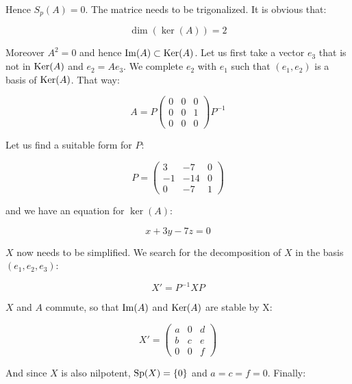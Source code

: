 \documentclass[11pt]{article}
\begin{document}
Hence $S_p(A) = {0}$. The matrice needs to be trigonalized. It is obvious that:

\begin{equation}
    \dim(\ker(A)) = 2
\end{equation}

Moreover $A^2 = 0$ and hence $\mathrm{Im}(A) \subset \mathrm{Ker}(A)$. Let us 
first take a vector $e_3$ that is not in $\mathrm{Ker}(A)$ and 
$e_2 = A e_3$. We complete $e_2$ with $e_1$ such that $(e_1, e_2)$ is a
basis of $\mathrm{Ker}(A)$. That way:

\begin{equation}
    A = P\begin{pmatrix} 0 & 0 & 0 \\ 0 & 0 & 1 \\ 0 & 0 & 0 \end{pmatrix}P^{-1}
\end{equation}

Let us find a suitable form for $P$:

\begin{equation}
    P = \begin{pmatrix} 3 & - 7 & 0 \\ -1 & - 14 & 0 \\ 0 & - 7 & 1 \end{pmatrix}
\end{equation}

and we have an equation for $\ker(A)$:

\begin{equation}
    x + 3 y - 7 z = 0
\end{equation}

$X$ now needs to be simplified. We search for the decomposition of $X$ in the basis $(e_1, e_2, e_3)$:

\begin{equation}
    X' = P^{-1} X P
\end{equation}

$X$ and $A$ commute, so that $\mathrm{Im}(A)$ and $\mathrm{Ker}(A)$ are stable by X:

\begin{equation}
    X' = \begin{pmatrix} a & 0 & d  \\ b & c & e  \\ 0 & 0 & f \end{pmatrix}
\end{equation}

And since $X$ is also nilpotent, $\mathrm{Sp}(X) = \{0\}$ and $a = c = f = 0$. Finally:
\end{document}
